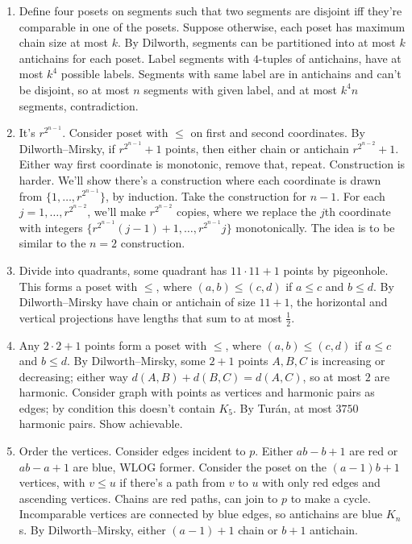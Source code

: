\documentclass[11pt,paper=letter]{scrartcl}
\begin{document}
\begin{enumerate}
\item Define four posets on segments such that two segments are disjoint iff they're comparable in one of the posets. Suppose otherwise, each poset has maximum chain size at most $k$. By Dilworth, segments can be partitioned into at most $k$ antichains for each poset. Label segments with $4$-tuples of antichains, have at most $k^4$ possible labels. Segments with same label are in antichains and can't be disjoint, so at most $n$ segments with given label, and at most $k^4n$ segments, contradiction.

\item It's $r^{2^{n-1}}$. Consider poset with $\le$ on first and second coordinates. By Dilworth--Mirsky, if $r^{2^{n-1}} + 1$ points, then either chain or antichain $r^{2^{n-2}} + 1$. Either way first coordinate is monotonic, remove that, repeat. Construction is harder. We'll show there's a construction where each coordinate is drawn from $\{1, \ldots, r^{2^{n-1}}\}$, by induction. Take the construction for $n - 1$. For each $j = 1, \ldots, r^{2^{n-2}}$, we'll make $r^{2^{n-2}}$ copies, where we replace the $j$th coordinate with integers $\{r^{2^{n-1}}(j - 1) + 1, \ldots, r^{2^{n-1}}j\}$ monotonically. The idea is to be similar to the $n = 2$ construction.

\item Divide into quadrants, some quadrant has $11 \cdot 11 + 1$ points by pigeonhole. This forms a poset with $\le$, where $(a, b) \le (c, d)$ if $a \le c$ and $b \le d$. By Dilworth--Mirsky have chain or antichain of size $11 + 1$, the horizontal and vertical projections have lengths that sum to at most $\frac12$.

\item Any $2 \cdot 2 + 1$ points form a poset with $\le$, where $(a, b) \le (c, d)$ if $a \le c$ and $b \le d$. By Dilworth--Mirsky, some $2 + 1$ points $A, B, C$ is increasing or decreasing; either way $d(A, B) + d(B, C) = d(A, C)$, so at most $2$ are harmonic. Consider graph with points as vertices and harmonic pairs as edges; by condition this doesn't contain $K_5$. By Tur\'an, at most $3750$ harmonic pairs. Show achievable.

\item Order the vertices. Consider edges incident to $p$. Either $ab - b + 1$ are red or $ab - a + 1$ are blue, WLOG former. Consider the poset on the $(a - 1)b + 1$ vertices, with $v \le u$ if there's a path from $v$ to $u$ with only red edges and ascending vertices. Chains are red paths, can join to $p$ to make a cycle. Incomparable vertices are connected by blue edges, so antichains are blue $K_n$s. By Dilworth--Mirsky, either $(a - 1) + 1$ chain or $b + 1$ antichain.


\end{enumerate}
\end{document}
